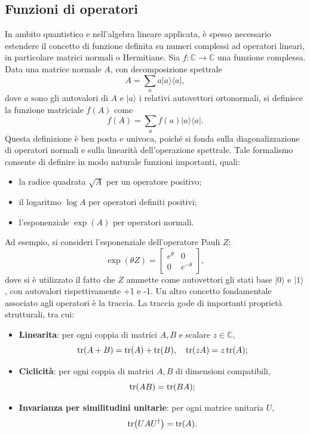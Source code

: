 \documentclass[a4paper,12pt]{report}
\theoremstyle{plain}
\begin{document}
\subsection{Funzioni di operatori}
In ambito quantistico e nell'algebra lineare applicata, è spesso necessario estendere il concetto di funzione definita su numeri complessi ad operatori lineari, in particolare matrici normali o Hermitiane. Sia \( f : \mathbb{C} \to \mathbb{C} \) una funzione complessa. Data una matrice normale \( A \), con decomposizione spettrale  
\[
A = \sum_a a |a\rangle \langle a|,
\]
dove \( a \) sono gli autovalori di \( A \) e \( |a\rangle \) i relativi autovettori ortonormali, si definisce la funzione matriciale \( f(A) \) come  
\[
f(A) = \sum_a f(a) |a\rangle \langle a|.
\]
Questa definizione è ben posta e univoca, poiché si fonda sulla diagonalizzazione di operatori normali e sulla linearità dell'operazione spettrale.
Tale formalismo consente di definire in modo naturale funzioni importanti, quali:  
\begin{itemize}
    \item la radice quadrata \( \sqrt{A} \) per un operatore positivo;
    \item il logaritmo \(\log A\) per operatori definiti positivi;
    \item l'esponenziale \(\exp(A)\) per operatori normali.
\end{itemize}
Ad esempio, si consideri l'esponenziale dell'operatore Pauli \( Z \):
\[
\exp(\theta Z) = 
\begin{bmatrix}
e^\theta & 0 \\
0 & e^{-\theta}
\end{bmatrix},
\]
dove si è utilizzato il fatto che \( Z \) ammette come autovettori gli stati base \( |0\rangle \) e \( |1\rangle \), con autovalori rispettivamente +1 e -1.
Un altro concetto fondamentale associato agli operatori è la traccia. La traccia gode di importanti proprietà strutturali, tra cui:
\begin{itemize}
    \item \textbf{Linearita}: per ogni coppia di matrici \( A, B \) e scalare \( z \in \mathbb{C} \),
    \[
    \tr(A+B) = \tr(A) + \tr(B), \quad \tr(zA) = z \tr(A);
    \]
    
    \item \textbf{Ciclicità}: per ogni coppia di matrici \( A, B \) di dimensioni compatibili,
    \[
    \tr(AB) = \tr(BA);
    \]
    
    \item \textbf{Invarianza per similitudini unitarie}: per ogni matrice unitaria \( U \),
    \[
    \tr(UAU^\dagger) = \tr(A).
    \]
\end{itemize}
\end{document}
